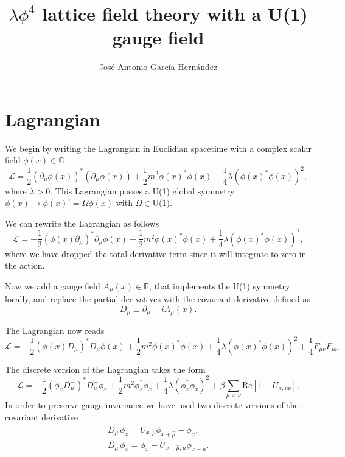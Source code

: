 \documentclass[12pt,a4paper]{article}
\author{José Antonio García Hernández}
\title{$\lambda \phi^4$ lattice field theory with a U(1) gauge field}
\begin{document}
\maketitle

\section{Lagrangian}
We begin by writing the Lagrangian in Euclidian spacetime with a complex scalar field $\phi(x)\in\mathbb{C}$
\begin{equation}
    \mathcal{L} = \frac{1}{2}\left(\partial_{\mu}\phi(x)\right)^* \left(\partial_{\mu}\phi(x)\right)+ \frac{1}{2}m^2\phi(x)^*\phi(x) + \frac{1}{4}\lambda\left(\phi(x)^*\phi(x)\right)^2,
\end{equation}
where $\lambda>0$. This Lagrangian posses a U(1) global symmetry $\phi(x) \to \phi(x)' = \Omega\phi(x)$ with $\Omega \in \text{U(1)}$.

We can rewrite the Lagrangian as follows
\begin{equation}
    \mathcal{L} = -\frac{1}{2}\left(\phi(x)\partial_{\mu}\right)^*\partial_{\mu}\phi(x) + \frac{1}{2}m^2\phi(x)^*\phi(x) + \frac{1}{4}\lambda\left(\phi(x)^*\phi(x)\right)^2 ,
\end{equation}
where we have dropped the total derivative term since it will integrate to zero in the action.

Now we add a gauge field $A_{\mu}(x)\in\mathbb{R}$, that implements the U(1) symmetry locally, and replace the partial derivatives with the covariant derivative defined as
\begin{equation}
    D_{\mu} \equiv \partial_{\mu} + iA_{\mu}(x).
\end{equation}

The Lagrangian now reads
\begin{equation}
    \mathcal{L} = -\frac{1}{2}\left(\phi(x) D_{\mu}\right)^*D_{\mu}\phi(x) + \frac{1}{2}m^2\phi(x)^*\phi(x) + \frac{1}{4}\lambda\left(\phi(x)^*\phi(x)\right)^2 + \frac{1}{4}F_{\mu\nu}F_{\mu\nu}.
\end{equation}

The discrete version of the Lagrangian takes the form 
\begin{equation}
    \mathcal{L} = -\frac{1}{2}\left(\phi_x D_{\mu}^-\right)^*D^+_{\mu}\phi_x + \frac{1}{2}m^2\phi_x^*\phi_x + \frac{1}{4}\lambda\left(\phi_x^*\phi_x\right)^2 + \beta\sum_{\mu<\nu}\text{Re} \left[1 - U_{x,\mu\nu} \right].
\end{equation}
In order to preserve gauge invariance we have used two discrete versions of the covariant derivative
\begin{eqnarray}
    D^+_{\mu}\phi_x = U_{x,\mu}\phi_{x+\hat{\mu}} - \phi_x ,\\
    D^-_{\mu}\phi_x = \phi_{x} - U_{x-\hat{\mu},\mu} \phi_{x-\hat{\mu}}. 
\end{eqnarray}
\end{document}
